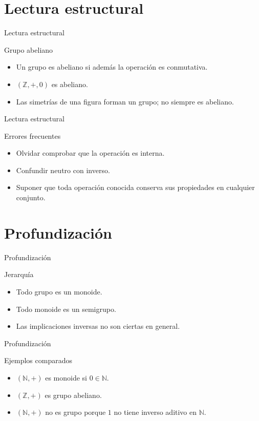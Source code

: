 \documentclass[aspectratio=169,11pt]{beamer}
\begin{document}
\section{Lectura estructural}

\begin{frame}{Lectura estructural}
\begin{block}{Grupo abeliano}
\begin{itemize}
  \item Un grupo es abeliano si además la operación es conmutativa.
  \item \((\mathbb{Z},+,0)\) es abeliano.
  \item Las simetrías de una figura forman un grupo; no siempre es abeliano.
\end{itemize}
\end{block}
\end{frame}

\begin{frame}{Lectura estructural}
\begin{block}{Errores frecuentes}
\begin{itemize}
  \item Olvidar comprobar que la operación es interna.
  \item Confundir neutro con inverso.
  \item Suponer que toda operación conocida conserva sus propiedades en cualquier conjunto.
\end{itemize}
\end{block}
\end{frame}

\section{Profundización}

\begin{frame}{Profundización}
\begin{block}{Jerarquía}
\begin{itemize}
  \item Todo grupo es un monoide.
  \item Todo monoide es un semigrupo.
  \item Las implicaciones inversas no son ciertas en general.
\end{itemize}
\end{block}
\end{frame}

\begin{frame}{Profundización}
\begin{block}{Ejemplos comparados}
\begin{itemize}
  \item \((\mathbb{N},+)\) es monoide si \(0\in\mathbb{N}\).
  \item \((\mathbb{Z},+)\) es grupo abeliano.
  \item \((\mathbb{N},+)\) no es grupo porque \(1\) no tiene inverso aditivo en \(\mathbb{N}\).
\end{itemize}
\end{block}
\end{frame}
\end{document}
